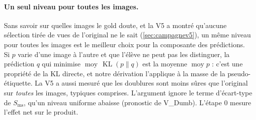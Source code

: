 \documentclass[11pt,a4paper]{article}
\newcommand{\KL}{\operatorname{KL}}
\newcommand{\Exp}{\operatorname*{moy}}
\begin{document}
\paragraph{Un seul niveau pour toutes les images.} Sans savoir sur quelles images le gold doute, et la
V5 a montré qu'aucune sélection tirée de vues de l'original ne le sait (\cref{sec:campagnev5}), un même
niveau pour toutes les images est le meilleur choix pour la composante des prédictions. Si $p$ varie
d'une image à l'autre et que l'élève ne peut pas les distinguer, la prédiction $q$ qui minimise
$\Exp\,\KL(p\|q)$ est la moyenne $\Exp p$ : c'est une propriété de la KL directe, et notre dérivation
l'applique à la masse de la pseudo-étiquette. La V5 a aussi mesuré que les doublures sont moins sûres
que l'original sur \emph{toutes} les images, typiques comprises. L'argument ignore le terme d'écart-type
de $S_{\text{ms}}$, qu'un niveau uniforme abaisse (pronostic de V\_Dumb). L'étape 0 mesure l'effet net
sur le produit.
\end{document}
